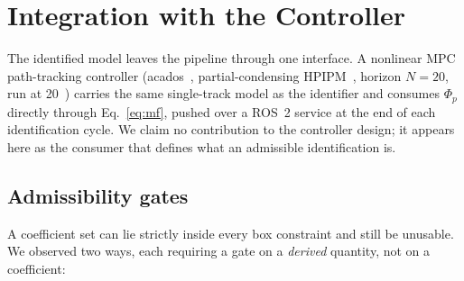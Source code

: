 \documentclass[lineno,12pt]{sn-jnl}
\makeatletter
\newif\ifsiu@prev
\DeclareRobustCommand{\siu@sep}{\ifsiu@prev\,\fi}
\DeclareRobustCommand{\siu@unit}[1]{\siu@sep\text{#1}\siu@prevtrue}
\DeclareRobustCommand{\siu@pre}[1]{\siu@sep\text{#1}\siu@prevfalse}
\DeclareRobustCommand{\siu@div}[1]{\text{#1}\siu@prevfalse}
\DeclareRobustCommand{\meter}{m}
\DeclareRobustCommand{\second}{s}
\DeclareRobustCommand{\gram}{g}
\DeclareRobustCommand{\newton}{N}
\DeclareRobustCommand{\radian}{rad}
\DeclareRobustCommand{\hertz}{Hz}
\DeclareRobustCommand{\percent}{\%}
\DeclareRobustCommand{\g}{\textit{g}}
\DeclareRobustCommand{\kilo}{k}
\DeclareRobustCommand{\milli}{m}
\DeclareRobustCommand{\per}{/}
\DeclareRobustCommand{\squared}{\ensuremath{^{2}}}
\providecommand{\degree}{\ensuremath{^{\circ}}}
\DeclareRobustCommand{\si}[1]{\begingroup
  \siu@prevfalse
  \renewcommand{\meter}{\siu@unit{m}}%
  \renewcommand{\second}{\siu@unit{s}}%
  \renewcommand{\gram}{\siu@unit{g}}%
  \renewcommand{\newton}{\siu@unit{N}}%
  \renewcommand{\radian}{\siu@unit{rad}}%
  \renewcommand{\hertz}{\siu@unit{Hz}}%
  \renewcommand{\percent}{\siu@unit{\%}}%
  \renewcommand{\degree}{\siu@unit{\ensuremath{^{\circ}}}}%
  \renewcommand{\g}{\siu@unit{\textit{g}}}%
  \renewcommand{\kilo}{\siu@pre{k}}%
  \renewcommand{\milli}{\siu@pre{m}}%
  \renewcommand{\per}{\siu@div{/}}%
  \renewcommand{\squared}{\ensuremath{^{2}}}%
  #1\endgroup}
\DeclareRobustCommand{\SI}[2]{#1\,\si{#2}}
\newcommand{\phip}{\Phi_{p}}
\theoremstyle{thmstyleone}%
\theoremstyle{thmstyletwo}%
\theoremstyle{thmstylethree}%
\makeatother
\begin{document}
\section{Integration with the Controller}
\label{sec:integration}

The identified model leaves the pipeline through one interface. A nonlinear MPC
path-tracking controller (acados~\cite{acados2022}, partial-condensing
HPIPM~\cite{hpipm2020}, horizon $N=20$, run at \SI{20}{\hertz})
carries the same single-track model as the identifier and consumes $\phip$
directly through Eq.~\eqref{eq:mf}, pushed over a ROS~2 service at the end of each
identification cycle. We claim no contribution to the controller design; it
appears here as the consumer that defines what an admissible identification is.

\subsection{Admissibility gates}
\label{subsec:gates}

A coefficient set can lie strictly inside every box constraint and still be
unusable. We observed two ways, each requiring a gate on a \emph{derived}
quantity, not on a coefficient:
\end{document}
